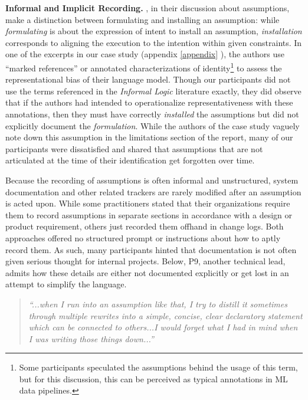 \smallskip
\noindent \textbf{Informal and Implicit Recording.} \citet{delin1994assumption}, in their discussion about assumptions, make a distinction between formulating and installing an assumption: while \textit{formulating} is about the expression of intent to install an assumption, \textit{installation} corresponds to aligning the execution to the intention within given constraints. In one of the excerpts in our case study (appendix \ref{appendix} \cite[p.~64]{anil2023palm}), the authors use ``marked references'' or annotated characterizations of identity\footnote{Some participants speculated the assumptions behind the usage of this term, but for this discussion, this can be perceived as typical annotations in ML data pipelines.} to assess the representational bias of their language model. Though our participants did not use the terms referenced in the \textit{Informal Logic} literature exactly, they did observe that if the authors had intended to operationalize representativeness with these annotations, then they must have correctly \textit{installed} the assumptions but did not explicitly document the \textit{formulation}. While the authors of the case study vaguely note down this assumption in the limitations section of the report, many of our participants were dissatisfied and shared that assumptions that are not articulated at the time of their identification get forgotten over time. 

Because the recording of assumptions is often informal and unstructured, system documentation and other related trackers are rarely modified after an assumption is acted upon. While some practitioners stated that their organizations require them to record assumptions in separate sections in accordance with a design or product requirement, others just recorded them offhand in change logs. Both approaches offered no structured prompt or instructions about how to aptly record them. As such, many participants hinted that documentation is not often given serious thought for internal projects. Below, P9, another technical lead, admits how these details are either not documented explicitly or get lost in an attempt to simplify the language.

\begin{quote}
\textit{``...when I run into an assumption like that, I try to distill it sometimes through multiple rewrites into a simple, concise, clear declaratory statement which can be connected to others...I would forget what I had in mind when I was writing those things down...'' 
}
\end{quote} 

